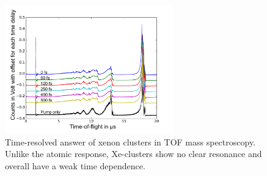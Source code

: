 %
\begin{figure}
	\centering
		\includegraphics[width=0.65\textwidth]{images/results/TOF-regular-cluster-xenon2.png}
	\caption[Time-resolved answer of xenon clusters in TOF spectroscopy.]{Time-resolved answer of xenon clusters in TOF mass spectroscopy. Unlike the atomic response, Xe-clusters show no clear resonance and overall have a weak time dependence.}
	\label{fig:TOF-traces-xenon-cluster}
\end{figure}
%
%
%
